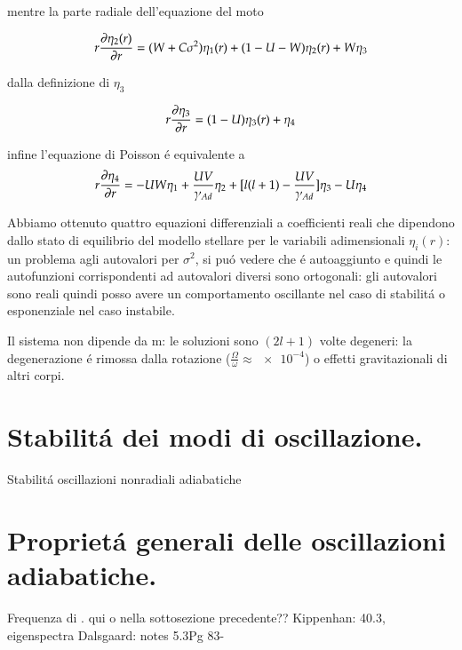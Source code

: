 \documentclass[../main.tex]{subfiles}
\begin{document}
mentre la parte radiale dell'equazione del moto

\begin{equation*}
r\PDy{r}{\eta_2(r)}=(W+C\sigma^2)\eta_1(r)+(1-U-W)\eta_2(r)+W\eta_3
\end{equation*}

dalla definizione di $\eta_3$

\begin{equation*}
r\PDy{r}{\eta_3}=(1-U)\eta_3(r)+\eta_4
\end{equation*}

infine l'equazione di Poisson \'e equivalente a
\begin{equation*}
r\PDy{r}{\eta_4}=-UW\eta_1+\frac{UV}{\gamma_{Ad}}\eta_2+[l(l+1)-\frac{UV}{\gamma_{Ad}}]\eta_3-U\eta_4
\end{equation*}



Abbiamo ottenuto quattro equazioni differenziali a coefficienti reali che dipendono dallo stato di equilibrio del modello stellare per le variabili adimensionali $\eta_i(r)$: un problema agli autovalori per $\sigma^2$, si pu\'o vedere che \'e autoaggiunto e quindi le autofunzioni corrispondenti ad autovalori diversi sono ortogonali: gli autovalori sono reali quindi posso avere un comportamento oscillante nel caso di stabilit\'a o esponenziale nel caso instabile.

Il sistema non dipende da m: le soluzioni sono $(2l+1)$ volte degeneri: la degenerazione \'e rimossa dalla rotazione ($\frac{\Omega}{\omega}\approx\num{e-4}$) o effetti gravitazionali di altri corpi.


\section{Stabilit\'a dei modi di oscillazione.}

\begin{todo}{Stabilit\'a oscillazioni nonradiali adiabatiche}

\end{todo}

\section{Propriet\'a generali delle oscillazioni adiabatiche.}

\begin{todo}{Frequenza di \bv{}.}
qui o nella sottosezione precedente??
Kippenhan: 40.3, eigenspectra
Dalsgaard: notes 5.3Pg 83-
\end{todo}
\end{document}
